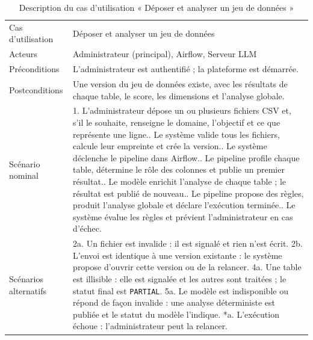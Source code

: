\begin{table}[H]
\centering
\small
\begin{tabular}{|L{3.4cm}|L{10.6cm}|}
\hline
{} &  \\ \hline
Cas d'utilisation & Déposer et analyser un jeu de données \\ \hline
Acteurs & Administrateur (principal), Airflow, Serveur LLM \\ \hline
Préconditions & L'administrateur est authentifié ; la plateforme est démarrée. \\ \hline
Postconditions & Une version du jeu de données existe, avec les résultats de chaque table, le score, les dimensions et l'analyse globale. \\ \hline
Scénario nominal &
1. L'administrateur dépose un ou plusieurs fichiers CSV et, s'il le souhaite, renseigne le domaine, l'objectif et ce que représente une ligne.. Le système valide tous les fichiers, calcule leur empreinte et crée la version.. Le système déclenche le pipeline dans Airflow.. Le pipeline profile chaque table, détermine le rôle des colonnes et publie un premier résultat.. Le modèle enrichit l'analyse de chaque table ; le résultat est publié de nouveau.. Le pipeline propose des règles, produit l'analyse globale et déclare l'exécution terminée.. Le système évalue les règles et prévient l'administrateur en cas d'échec. \\ \hline
Scénarios alternatifs &
2a. Un fichier est invalide : il est signalé et rien n'est écrit.\newline
2b. L'envoi est identique à une version existante : le système propose d'ouvrir cette version ou de la relancer.\newline
4a. Une table est illisible : elle est signalée et les autres sont traitées ; le statut final est \texttt{PARTIAL}.\newline
5a. Le modèle est indisponible ou répond de façon invalide : une analyse déterministe est publiée et le statut du modèle l'indique.\newline
*a. L'exécution échoue : l'administrateur peut la relancer. \\ \hline
\end{tabular}
\caption{Description du cas d'utilisation « Déposer et analyser un jeu de données »}
\label{tab:cu-deposer}
\end{table}

